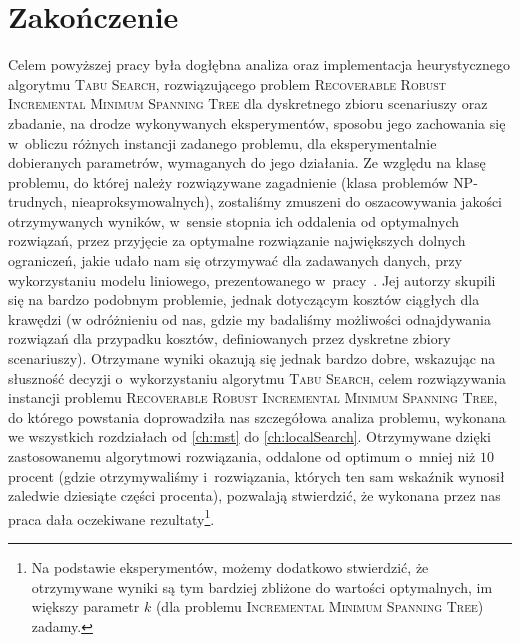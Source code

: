 \chapter{Zakończenie}
\thispagestyle{chapterBeginStyle}





Celem powyższej pracy była dogłębna analiza oraz implementacja heurystycznego algorytmu \textsc{Tabu Search}, rozwiązującego problem \textsc{Recoverable Robust Incremental Minimum Spanning Tree} dla dyskretnego zbioru scenariuszy oraz zbadanie, na drodze wykonywanych eksperymentów, sposobu jego zachowania się w~obliczu różnych instancji zadanego problemu, dla eksperymentalnie dobieranych parametrów, wymaganych do jego działania.
Ze względu na klasę problemu, do której należy rozwiązywane zagadnienie (klasa problemów \textsc{NP}-trudnych, nieaproksymowalnych), zostaliśmy zmuszeni do oszacowywania jakości otrzymywanych wyników, w~sensie stopnia ich oddalenia od optymalnych rozwiązań, przez przyjęcie za optymalne rozwiązanie największych dolnych ograniczeń, jakie udało nam się otrzymywać dla zadawanych danych, przy wykorzystaniu modelu liniowego, prezentowanego w~pracy~\cite{DBLP:journals/corr/HradovichKZ16}.
Jej autorzy skupili się na bardzo podobnym problemie, jednak dotyczącym kosztów ciągłych dla krawędzi (w odróżnieniu od nas, gdzie my badaliśmy możliwości odnajdywania rozwiązań dla przypadku kosztów, definiowanych przez dyskretne zbiory scenariuszy).
Otrzymane wyniki okazują się jednak bardzo dobre, wskazując na słuszność decyzji o~wykorzystaniu algorytmu \textsc{Tabu Search}, celem rozwiązywania instancji problemu \textsc{Recoverable Robust Incremental Minimum Spanning Tree}, do którego powstania doprowadziła nas szczegółowa analiza problemu, wykonana we wszystkich rozdziałach od \ref{ch:mst} do \ref{ch:localSearch}.
Otrzymywane dzięki zastosowanemu algorytmowi rozwiązania, oddalone od optimum o~mniej niż $10$ procent (gdzie otrzymywaliśmy i~rozwiązania, których ten sam wskaźnik wynosił zaledwie dziesiąte części procenta), pozwalają stwierdzić, że wykonana przez nas praca dała oczekiwane rezultaty\footnote{
	Na podstawie eksperymentów, możemy dodatkowo stwierdzić, że otrzymywane wyniki są tym bardziej zbliżone do wartości optymalnych, im większy parametr $k$ (dla problemu \textsc{Incremental Minimum Spanning Tree}) zadamy.
}.